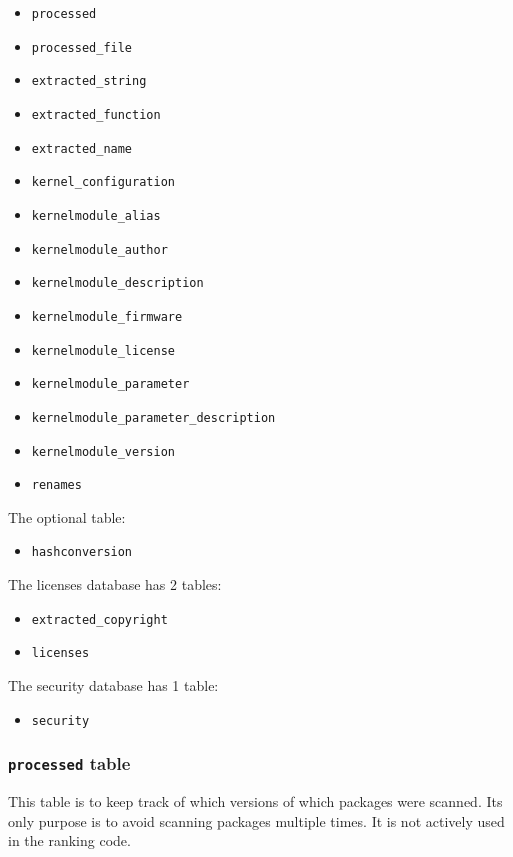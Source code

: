 \documentclass[10pt,a4paper]{article}
\begin{document}
\begin{itemize}
\item \texttt{processed}
\item \texttt{processed\_file}
\item \texttt{extracted\_string}
\item \texttt{extracted\_function}
\item \texttt{extracted\_name}
\item \texttt{kernel\_configuration}
\item \texttt{kernelmodule\_alias}
\item \texttt{kernelmodule\_author}
\item \texttt{kernelmodule\_description}
\item \texttt{kernelmodule\_firmware}
\item \texttt{kernelmodule\_license}
\item \texttt{kernelmodule\_parameter}
\item \texttt{kernelmodule\_parameter\_description}
\item \texttt{kernelmodule\_version}
\item \texttt{renames}
\end{itemize}

The optional table:

\begin{itemize}
\item \texttt{hashconversion}
\end{itemize}

The licenses database has 2 tables:

\begin{itemize}
\item \texttt{extracted\_copyright}
\item \texttt{licenses}
\end{itemize}

The security database has 1 table:

\begin{itemize}
\item \texttt{security}
\end{itemize}

\subsubsection{\texttt{processed} table}

This table is to keep track of which versions of which packages were scanned.
Its only purpose is to avoid scanning packages multiple times. It is not
actively used in the ranking code.
\end{document}
